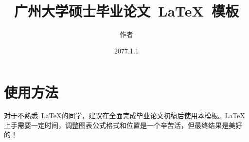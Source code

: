 \documentclass{GZHUMaster}
\begin{document}
\setmainfont{Times New Roman}  %

\title{广州大学硕士毕业论文~\LaTeX~模板}                       %
\author{作者}                   %
\Supervisor{}                  %
\date{2077.1.1}               %
\Chairman{}                    %
\Member{}                      %

\maketitle

\frontmatter
{}               %
\cleardoublepage
\newpage
\pagestyle{fancy}
\fancyfancy


{\tableofcontents}

\mainmatter %
\renewcommand{\baselinestretch}{1.5}  %
\renewcommand{\thefigure}{\thechapter-\arabic{figure}} %
\renewcommand{\thetable}{\thechapter-\arabic{table}}   %

\chapter{使用方法}
对于不熟悉~\LaTeX 的同学，建议在全面完成毕业论文初稿后使用本模板。\LaTeX 上手需要一定时间，调整图表公式格式和位置是一个辛苦活，但最终结果是美好的！
\end{document}
